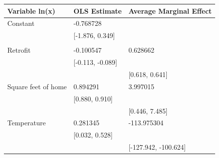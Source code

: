 \begin{tabular}{lll}
\toprule
Variable ln(x) & OLS Estimate & Average Marginal Effect \\
\midrule
Constant & -0.768728 &  \\
 & [-1.876, 0.349] &  \\
 &  &  \\
Retrofit & -0.100547 & 0.628662 \\
 & [-0.113, -0.089] &  \\
 &  & [0.618, 0.641] \\
Square feet of home & 0.894291 & 3.997015 \\
 & [0.880, 0.910] &  \\
 &  & [0.446, 7.485] \\
Temperature & 0.281345 & -113.975304 \\
 & [0.032, 0.528] &  \\
 &  & [-127.942, -100.624] \\
\bottomrule
\end{tabular}
